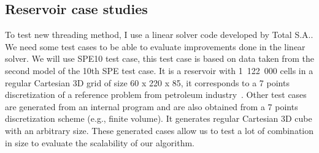 \subsection{Reservoir case studies}
To test new threading method, I use a linear solver code developed by Total S.A..
%
We need some test cases to be able to evaluate improvements done in the linear solver.
%
We will use SPE10 test case, this test case is based on data taken from the second model of the 10th SPE test case\cite{SPE10}.
%
It is a reservoir with 1~122~000 cells in a regular Cartesian 3D grid of size 60 x 220 x 85, it corresponds to a 7 points discretization of a reference problem from petroleum industry~\cite{SPE10}.
%
Other test cases are generated from an internal program and are also obtained from a 7 points discretization scheme (e.g., finite volume).
%
It generates regular Cartesian 3D cube with an arbitrary size.
%
These generated cases allow us to test a lot of combination in size to evaluate the scalability of our algorithm.
